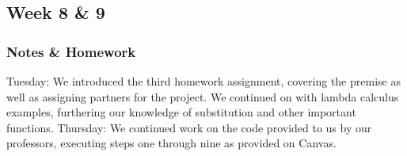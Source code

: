 \documentclass{article}
\theoremstyle{theorem}
\theoremstyle{definition}
\theoremstyle{remark}
\begin{document}
\subsection{Week 8 \& 9}

\subsubsection{ Notes \& Homework}
Tuesday: We introduced the third homework assignment, covering the premise as well as assigning partners for the project. We continued on with lambda calculus examples, furthering our knowledge of substitution and other important functions.
\newline Thursday: We continued work on the code provided to us by our professors, executing steps one through nine as provided on Canvas.
\end{document}
